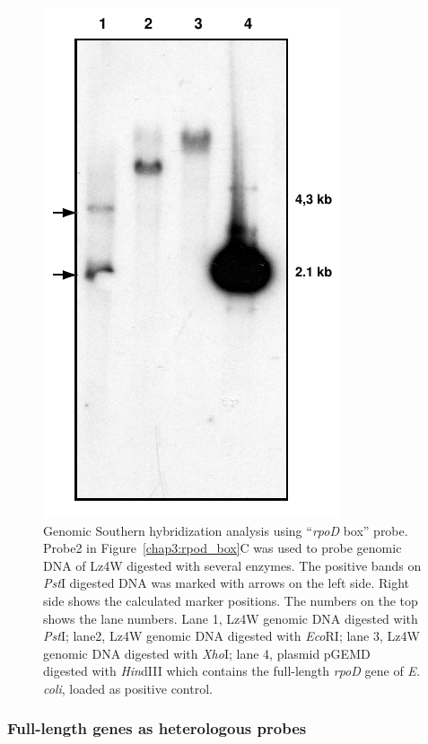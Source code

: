 \begin{figure}[tbp]
\centering
\includegraphics{figures/chap3_rpod_box_southern}
\caption[Genomic Southern blot analysis using ``\emph{rpoD} box''
probe]{%
    Genomic Southern hybridization analysis using ``\emph{rpoD} box''
    probe. Probe2 in Figure~\ref{chap3:rpod_box}C was used to
    probe genomic DNA of Lz4W digested with several enzymes. The
    positive bands on \emph{Pst}I digested DNA was marked with
    arrows on the left side. Right side shows the calculated
    marker positions. The numbers on the top shows the lane
    numbers. Lane 1, Lz4W genomic DNA digested with \emph{Pst}I;
    lane2, Lz4W genomic DNA digested with \emph{Eco}RI; lane 3,
    Lz4W genomic DNA digested with \emph{Xho}I; lane 4, plasmid
    pGEMD~\citep{Igarashi1991} digested with \emph{Hin}dIII which
    contains the full-length \emph{rpoD} gene of \emph{E. coli},
    loaded as positive control.}
\label{chap3:rpod_box_southern}
\end{figure}

\subsubsection{Full-length genes as heterologous probes}

